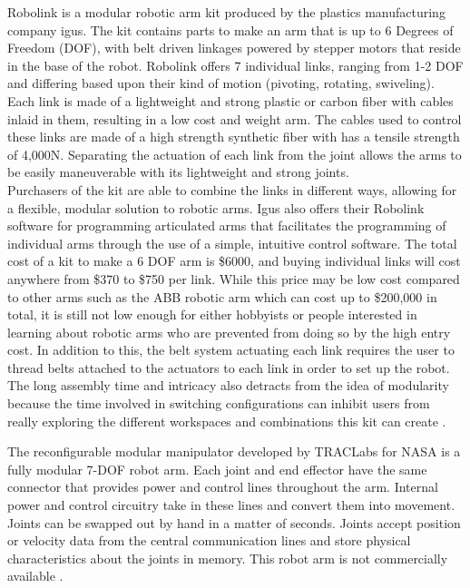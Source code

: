 Robolink is a modular robotic arm kit produced by the plastics manufacturing company igus.  The kit contains parts to make an arm that is up to 6 Degrees of Freedom (DOF), with belt driven linkages powered by stepper motors that reside in the base of the robot.  Robolink offers 7 individual links, ranging from 1-2 DOF and differing based upon their kind of motion (pivoting, rotating, swiveling).  Each link is made of a lightweight and strong plastic or carbon fiber with cables inlaid in them, resulting in a low cost and weight arm.  The cables used to control these links are made of a high strength synthetic fiber with has a tensile strength of 4,000N.  Separating the actuation of each link from the joint allows the arms to be easily maneuverable with its lightweight and strong joints.  \\
\newline
Purchasers of the kit are able to combine the links in different ways, allowing for a flexible, modular solution to robotic arms. Igus also offers their Robolink software for programming articulated arms that facilitates the programming of individual arms through the use of a simple, intuitive control software. The total cost of a kit to make a 6 DOF arm is \$6000, and buying individual links will cost anywhere from \$370 to \$750 per link. While this price may be low cost compared to other arms such as the ABB robotic arm which can cost up to \$200,000 in total, it is still not low enough for either hobbyists or people interested in learning about robotic arms who are prevented from doing so by the high entry cost. In addition to this, the belt system actuating each link requires the user to thread belts attached to the actuators to each link in order to set up the robot. The long assembly time and intricacy also detracts from the idea of modularity because the time involved in switching configurations can inhibit users from really exploring the different workspaces and combinations this kit can create \cite{igus}.  

The reconfigurable modular manipulator developed by TRACLabs for NASA is a fully modular 7-DOF robot arm. Each joint and end effector have the same connector that provides power and control lines throughout the arm. Internal power and control circuitry take in these lines and convert them into movement. Joints can be swapped out by hand in a matter of seconds. Joints accept position or velocity data from the central communication lines and store physical characteristics about the joints in memory. This robot arm is not commercially available \cite{RMM}.

